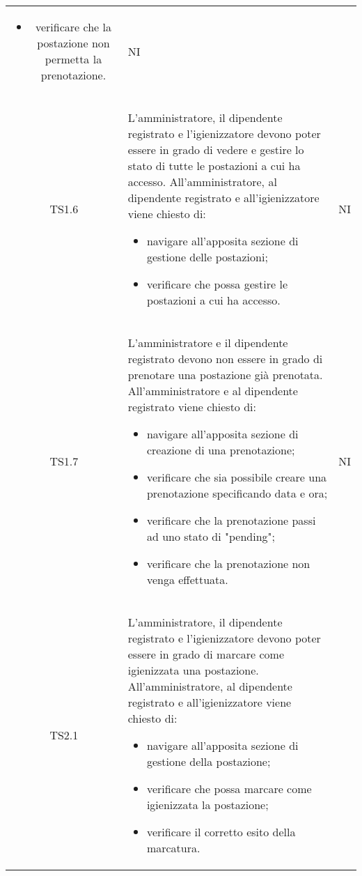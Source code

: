 {\begin{longtable}{ c C{11cm} c }
\begin{itemize}
            \item verificare che la postazione non permetta la prenotazione.
        \end{itemize}&
        NI\\
        TS1.6&
        L'amministratore, il dipendente registrato e l'igienizzatore devono poter essere in grado di vedere e gestire lo stato di tutte le postazioni a cui ha accesso.\newline
        All'amministratore, al dipendente registrato e all'igienizzatore viene chiesto di:
        \begin{itemize}
            \item navigare all'apposita sezione di gestione delle postazioni;
            \item verificare che possa gestire le postazioni a cui ha accesso.
        \end{itemize}&
        NI\\
        TS1.7&
        L'amministratore e il dipendente registrato devono non essere in grado di prenotare una postazione già prenotata.\newline
        All'amministratore e al dipendente registrato viene chiesto di:
        \begin{itemize}
            \item navigare all'apposita sezione di creazione di una prenotazione;
            \item verificare che sia possibile creare una prenotazione specificando data e ora;
            \item verificare che la prenotazione passi ad uno stato di "pending";
            \item verificare che la prenotazione non venga effettuata.
        \end{itemize}&
        NI\\
        TS2.1&
        L'amministratore, il dipendente registrato e l'igienizzatore devono poter essere in grado di marcare come igienizzata una postazione.\newline
        All'amministratore, al dipendente registrato e all'igienizzatore viene chiesto di:
        \begin{itemize}
            \item navigare all'apposita sezione di gestione della postazione;
            \item verificare che possa marcare come igienizzata la postazione;
            \item verificare il corretto esito della marcatura.

\end{itemize}
\end{longtable}}
